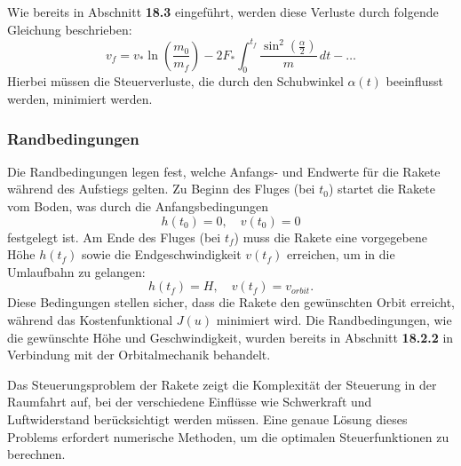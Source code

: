 Wie bereits in Abschnitt \textbf{18.3} eingeführt, werden diese Verluste durch folgende Gleichung beschrieben:
\[
v_f = v_* \ln \left(\frac{m_0}{m_f}\right) - 2F_* \int_0^{t_f} \frac{\sin^2\left(\frac{\alpha}{2}\right)}{m} \, dt - \dots
\]
Hierbei müssen die Steuerverluste, die durch den Schubwinkel \( \alpha(t) \) beeinflusst werden, minimiert werden.

\subsubsection{Randbedingungen}
Die Randbedingungen legen fest, welche Anfangs- und Endwerte für die Rakete während des Aufstiegs gelten. Zu Beginn des Fluges (bei \( t_0 \)) startet die Rakete vom Boden, was durch die Anfangsbedingungen
\[
h(t_0) = 0, \quad v(t_0) = 0
\]
festgelegt ist. Am Ende des Fluges (bei \( t_f \)) muss die Rakete eine vorgegebene Höhe \( h(t_f) \) sowie die Endgeschwindigkeit \( v(t_f) \) erreichen, um in die Umlaufbahn zu gelangen:
\[
h(t_f) = H, \quad v(t_f) = v_{orbit}.
\]
Diese Bedingungen stellen sicher, dass die Rakete den gewünschten Orbit erreicht, während das Kostenfunktional \( J(u) \) minimiert wird.
Die Randbedingungen, wie die gewünschte Höhe und Geschwindigkeit, wurden bereits in Abschnitt \textbf{18.2.2} in Verbindung mit der Orbitalmechanik behandelt.

Das Steuerungsproblem der Rakete zeigt die Komplexität der Steuerung in der Raumfahrt auf, bei der verschiedene Einflüsse wie Schwerkraft und Luftwiderstand berücksichtigt werden müssen. Eine genaue Lösung dieses Problems erfordert numerische Methoden, um die optimalen Steuerfunktionen zu berechnen.
